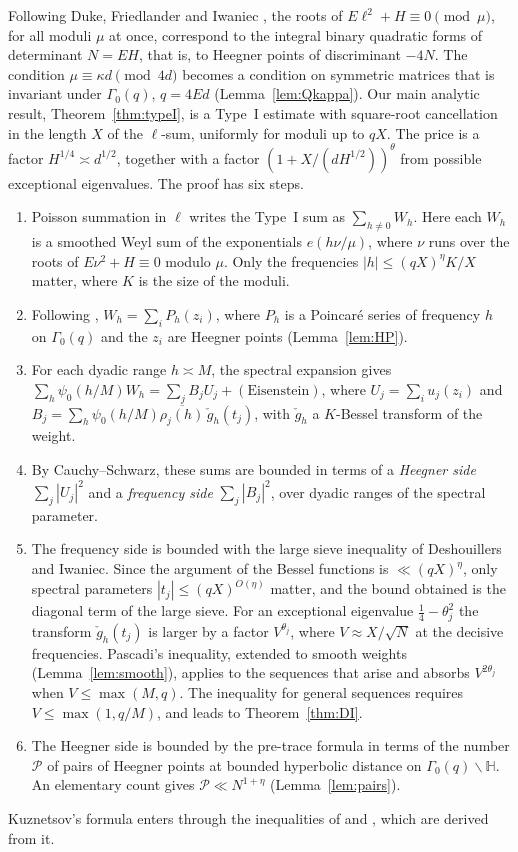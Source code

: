 \documentclass[11pt]{amsart}
\theoremstyle{remark}
\theoremstyle{definition}
\numberwithin{equation}{section}
\newcommand{\Pc}{\mathcal{P}}
\newcommand{\Hb}{\mathbb{H}}
\begin{document}
Following Duke, Friedlander and Iwaniec \cite{DFI95}, the roots of $E\ell^2+H\equiv0\pmod\mu$, for all moduli $\mu$ at once, correspond to the integral binary quadratic forms of determinant $N=EH$, that is, to Heegner points of discriminant $-4N$. The condition $\mu\equiv\kappa d\pmod{4d}$ becomes a condition on symmetric matrices that is invariant under $\Gamma_0(q)$, $q=4Ed$ (Lemma~\ref{lem:Qkappa}). Our main analytic result, Theorem~\ref{thm:typeI}, is a Type~I estimate with square-root cancellation in the length $X$ of the $\ell$-sum, uniformly for moduli up to $qX$. The price is a factor $H^{1/4}\asymp d^{1/2}$, together with a factor $(1+X/(dH^{1/2}))^\theta$ from possible exceptional eigenvalues. The proof has six steps.
\begin{enumerate}
\item Poisson summation in $\ell$ writes the Type~I sum as $\sum_{h\ne0}W_h$. Here each $W_h$ is a smoothed Weyl sum of the exponentials $e(h\nu/\mu)$, where $\nu$ runs over the roots of $E\nu^2+H\equiv0$ modulo $\mu$. Only the frequencies $|h|\le(qX)^\eta K/X$ matter, where $K$ is the size of the moduli.
\item Following \cite{DFI95}, $W_h=\sum_iP_h(z_i)$, where $P_h$ is a Poincar\'e series of frequency $h$ on $\Gamma_0(q)$ and the $z_i$ are Heegner points (Lemma~\ref{lem:HP}).
\item For each dyadic range $h\asymp M$, the spectral expansion gives $\sum_h\psi_0(h/M)W_h=\sum_jB_jU_j+(\text{Eisenstein})$, where $U_j=\sum_iu_j(z_i)$ and $B_j=\sum_h\psi_0(h/M)\overline{\rho_j(h)}\,\check g_h(t_j)$, with $\check g_h$ a $K$-Bessel transform of the weight.
\item By Cauchy--Schwarz, these sums are bounded in terms of a \emph{Heegner side} $\sum_j|U_j|^2$ and a \emph{frequency side} $\sum_j|B_j|^2$, over dyadic ranges of the spectral parameter.
\item The frequency side is bounded with the large sieve inequality of Deshouillers and Iwaniec. Since the argument of the Bessel functions is $\ll(qX)^\eta$, only spectral parameters $|t_j|\le(qX)^{O(\eta)}$ matter, and the bound obtained is the diagonal term of the large sieve. For an exceptional eigenvalue $\frac14-\theta_j^2$ the transform $\check g_h(t_j)$ is larger by a factor $V^{\theta_j}$, where $V\approx X/\sqrt N$ at the decisive frequencies. Pascadi's inequality, extended to smooth weights (Lemma~\ref{lem:smooth}), applies to the sequences that arise and absorbs $V^{2\theta_j}$ when $V\le\max(M,q)$. The inequality \cite[Theorem~5]{DI} for general sequences requires $V\le\max(1,q/M)$, and leads to Theorem~\ref{thm:DI}.
\item The Heegner side is bounded by the pre-trace formula in terms of the number $\Pc$ of pairs of Heegner points at bounded hyperbolic distance on $\Gamma_0(q)\backslash\Hb$. An elementary count gives $\Pc\ll N^{1+\eta}$ (Lemma~\ref{lem:pairs}).
\end{enumerate}
Kuznetsov's formula \cite{Kuz} enters through the inequalities of \cite{DI} and \cite{Pas}, which are derived from it.
\end{document}
